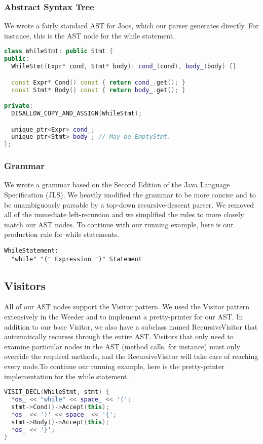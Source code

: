 \documentclass[12pt, titlepage]{article}
\begin{document}
\subsubsection{Abstract Syntax Tree}
We wrote a fairly standard AST for Joos, which our parser generates directly.
For instance, this is the AST node for the while statement.
\begin{lstlisting}[language=c++]
class WhileStmt: public Stmt {
public:
  WhileStmt(Expr* cond, Stmt* body): cond_(cond), body_(body) {}

  const Expr* Cond() const { return cond_.get(); }
  const Stmt* Body() const { return body_.get(); }

private:
  DISALLOW_COPY_AND_ASSIGN(WhileStmt);

  unique_ptr<Expr> cond_;
  unique_ptr<Stmt> body_; // May be EmptyStmt.
};
\end{lstlisting}

\subsubsection{Grammar}
We wrote a grammar based on the Second Edition of the Java Language
Specification (JLS). We heavily modified the grammar to be more concise and to
be unambiguously parsable by a top-down recursive-descent parser. We removed
all of the immediate left-recursion and we simplified the rules to more closely
match our AST nodes. To continue with our running example, here is our
production rule for while statements.
\begin{lstlisting}
WhileStatement:
  "while" "(" Expression ")" Statement
\end{lstlisting}

\subsection{Visitors}
All of our AST nodes support the Visitor pattern. We used the Visitor pattern
extensively in the Weeder and to implement a pretty-printer for our AST. In
addition to our base Visitor, we also have a subclass named RecursiveVisitor
that automatically recurses through the entire AST. Visitors that only need to
examine particular nodes in the AST (method calls, for instance) must only
override the required methods, and the RecursiveVisitor will take care of
reaching every node.To continue our running example, here is the pretty-printer
implementation for the while statement.
\begin{lstlisting}[language=c++]
VISIT_DECL(WhileStmt, stmt) {
  *os_ << "while" << space_ << '(';
  stmt->Cond()->Accept(this);
  *os_ << ')' << space_ << '{';
  stmt->Body()->Accept(this);
  *os_ << '}';
}
\end{lstlisting}
\end{document}

